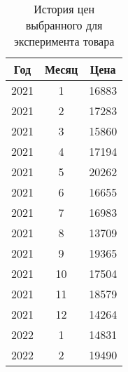 \documentclass{bmstu}
\begin{document}
\begin{table}[H]
	\caption{История цен выбранного для эксперимента товара}
	\begin{center}
		\begin{tabular}{| c | c | c |} 
			\hline
			
			\textbf{Год} & \textbf{Месяц} & \textbf{Цена} \\  
			
			\hline
			
			2021 & 1 & 16883 \\
			
			\hline
			
			2021 & 2 & 17283 \\
			
			\hline
			
			2021 & 3 & 15860 \\
			
			\hline
			
			2021 & 4 & 17194 \\
			
			\hline
			
			2021 & 5 & 20262 \\
			
			\hline
			
			2021 & 6 & 16655 \\
			
			\hline
			
			2021 & 7 & 16983 \\
			
			\hline
			
			2021 & 8 & 13709 \\
			
			\hline
			
			2021 & 9 & 19365 \\
			
			\hline
			
			2021 & 10 & 17504 \\
			
			\hline
			
			2021 & 11 & 18579 \\
			
			\hline
			
			2021 & 12 & 14264 \\
			
			\hline
			
			2022 & 1 & 14831 \\
			
			\hline
			
			2022 & 2 & 19490 \\
			

\end{tabular}
\end{center}
\end{table}
\end{document}
